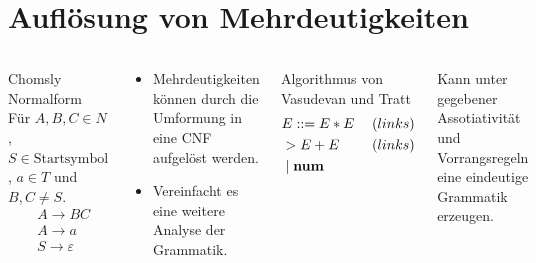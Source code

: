 \documentclass[t]{beamer}
\renewcommand{\Coloneqq}{\mathrel{\mathop{::}}=}
\begin{document}
	\section{Auflösung von Mehrdeutigkeiten}\label{sec:auflsung-von-mehrdeutigkeiten}
	\begin{frame}
		\begin{columns}[T]
			\begin{block}{Chomsly Normalform}
				Für $A,B,C \in N$, $S \in \text{Startsymbol}$, $a \in T$ und $B,C \neq S$. \\
				\begin{align*}
					& A \rightarrow BC \\
					& A \rightarrow a \\
					& S \rightarrow \varepsilon
				\end{align*}
			\end{block}
			\begin{exampleblock}
				\begin{itemize}
					\item Mehrdeutigkeiten können durch die Umformung in eine CNF aufgelöst werden.\cite{kemp1974}
					\item Vereinfacht es eine weitere Analyse der Grammatik.
				\end{itemize}
			\end{exampleblock}
			\begin{block}{Algorithmus von Vasudevan und Tratt}
				\begin{align*}
					& E \Coloneqq E * E \phantom{|} & (links) \\
					& > E + E & (links) \\
					& \phantom{|} | \phantom{|} \bold{num}
				\end{align*}
			\end{block}
			\begin{exampleblock}
				Kann unter gegebener Assotiativität und Vorrangsregeln eine eindeutige Grammatik erzeugen.

			\end{exampleblock}
		\end{columns}
	\end{frame}
\end{document}
